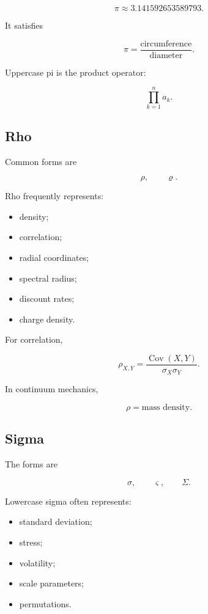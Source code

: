 \[
\boxed{
\pi
\approx
3.141592653589793.
}
\]

It satisfies

\[
\boxed{
\pi
=
\frac{
\text{circumference}
}{
\text{diameter}
}.
}
\]

Uppercase pi is the product operator:

\[
\boxed{
\prod_{k=1}^{n}a_k.
}
\]

\subsection{Rho}
\label{subsec:greek-rho}

Common forms are

\[
\boxed{
\rho,
\qquad
\varrho.
}
\]

Rho frequently represents:

\begin{itemize}
    \item density;
    \item correlation;
    \item radial coordinates;
    \item spectral radius;
    \item discount rates;
    \item charge density.
\end{itemize}

For correlation,

\[
\boxed{
\rho_{X,Y}
=
\frac{
\operatorname{Cov}(X,Y)
}{
\sigma_X\sigma_Y
}.
}
\]

In continuum mechanics,

\[
\boxed{
\rho
=
\text{mass density}.
}
\]

\subsection{Sigma}
\label{subsec:greek-sigma}

The forms are

\[
\boxed{
\sigma,
\qquad
\varsigma,
\qquad
\Sigma.
}
\]

Lowercase sigma often represents:

\begin{itemize}
    \item standard deviation;
    \item stress;
    \item volatility;
    \item scale parameters;
    \item permutations.
\end{itemize}

